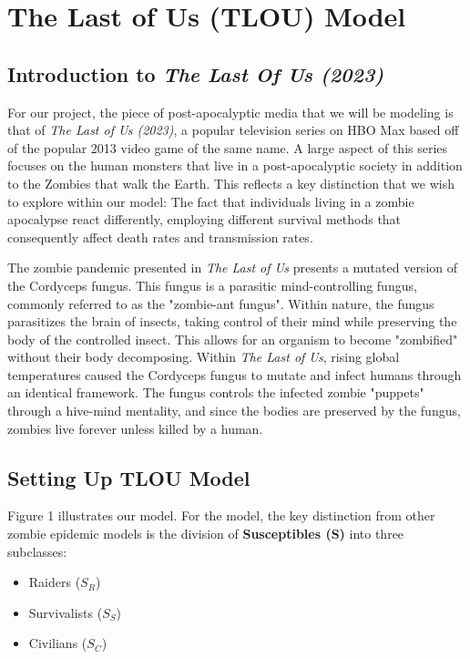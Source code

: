\documentclass{article}
\begin{document}
\section{The Last of Us (TLOU) Model}

\subsection{Introduction to \textit{The Last Of Us (2023)}}

For our project, the piece of post-apocalyptic media that we will be modeling is that of \textit{The Last of Us (2023)}, a popular television series on HBO Max based off of the popular 2013 video game of the same name. A large aspect of this series focuses on the human monsters that live in a post-apocalyptic society in addition to the Zombies that walk the Earth. This reflects a key distinction that we wish to explore within our model: The fact that individuals living in a zombie apocalypse react differently, employing different survival methods that consequently affect death rates and transmission rates.

The zombie pandemic presented in \textit{The Last of Us} presents a mutated version of the Cordyceps fungus. This fungus is a parasitic mind-controlling fungus, commonly referred to as the "zombie-ant fungus". Within nature, the fungus parasitizes the brain of insects, taking control of their mind while preserving the body of the controlled insect. This allows for an organism to become "zombified" without their body decomposing. Within \textit{The Last of Us}, rising global temperatures caused the Cordyceps fungus to mutate and infect humans through an identical framework. The fungus controls the infected zombie "puppets" through a hive-mind mentality, and since the bodies are preserved by the fungus, zombies live forever unless killed by a human.

\subsection{Setting Up TLOU Model}

Figure 1 illustrates our model. For the model, the key distinction from other zombie epidemic models is the division of \textbf{Susceptibles (S)} into three subclasses:

\begin{itemize}
    \item Raiders ($S_R$)
    \item Survivalists ($S_S$)
    \item Civilians ($S_C$)
\end{itemize}
\end{document}
